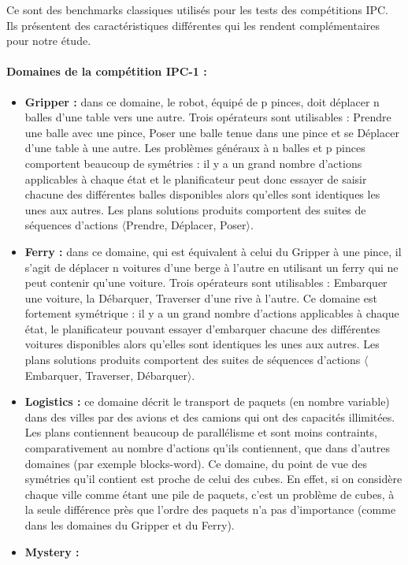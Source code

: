 Ce sont des benchmarks classiques utilisés pour les tests des compétitions IPC. Ils présentent des caractéristiques différentes qui les rendent complémentaires pour notre étude.

\paragraph*{Domaines de la compétition IPC-1 :}
\begin{itemize}
\item \textbf{Gripper :} dans ce domaine, le robot, équipé de p pinces, doit déplacer n balles d'une table vers une autre. Trois opérateurs sont utilisables : Prendre une balle avec une pince, Poser une balle tenue dans une pince et se Déplacer d'une table à une autre. Les problèmes généraux à n balles et p pinces comportent beaucoup de symétries : il y a un grand nombre d'actions applicables à chaque état et le planificateur peut donc essayer de saisir chacune des différentes balles disponibles alors qu'elles sont identiques les unes aux autres. Les plans solutions produits comportent des suites de séquences d'actions $\langle$Prendre, Déplacer, Poser$\rangle$.
\item \textbf{Ferry :}  dans ce domaine, qui est équivalent à celui du Gripper à une pince, il s'agit de déplacer n voitures d'une berge à l'autre en utilisant un ferry qui ne peut contenir qu'une voiture. Trois opérateurs sont utilisables : Embarquer une voiture, la Débarquer, Traverser d'une rive à l'autre. Ce domaine est fortement symétrique : il y a un grand nombre d'actions applicables à chaque état, le planificateur pouvant essayer d'embarquer chacune des différentes voitures disponibles alors qu'elles sont identiques les unes aux autres. Les plans solutions produits comportent des suites de séquences d'actions $\langle$Embarquer, Traverser, Débarquer$\rangle$.
\item \textbf{Logistics :} ce domaine décrit le transport de paquets (en nombre variable) dans des villes par des avions et des camions qui ont des capacités illimitées. Les plans contiennent beaucoup de parallélisme et sont moins contraints, comparativement  au nombre d'actions qu'ils contiennent, que dans d'autres domaines (par exemple blocks-word). Ce domaine, du point de vue des symétries qu'il contient est proche de celui des cubes. En effet, si on considère chaque ville comme étant une pile de paquets, c'est un problème de cubes, à la seule différence près que l'ordre des paquets n'a pas d'importance (comme dans les domaines du Gripper et du Ferry).
\item \textbf{Mystery :}
\end{itemize}

